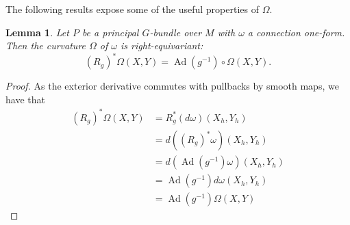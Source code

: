 \documentclass{book}
\DeclareMathOperator{\Ad}{Ad}
\theoremstyle{plain}
\newtheorem{lem}[thm]{Lemma}
\theoremstyle{definition}
\theoremstyle{remark}
\begin{document}
The following results expose some of the useful properties of $\Omega$.

\begin{lem}
Let $P$ be a principal $G$-bundle over $M$ with $\omega$ a connection one-form. Then the curvature $\Omega$ of $\omega$ is right-equivariant:
\[(R_g)^*\Omega(X,Y)=\Ad(g^{-1})\circ \Omega(X,Y).\]
\end{lem}
\begin{proof}
As the exterior derivative commutes with pullbacks by smooth maps, we have that
\begin{align*}
(R_g)^*\Omega(X,Y)&=R_g^*(d\omega)(X_h,Y_h)\\
&=d((R_g)^*\omega)(X_h,Y_h)\\
&=d(\Ad(g^{-1})\omega)(X_h,Y_h)\\
&=\Ad(g^{-1})d\omega(X_h,Y_h)\\
&=\Ad(g^{-1})\Omega(X,Y)
\end{align*}
\end{proof}
\end{document}
